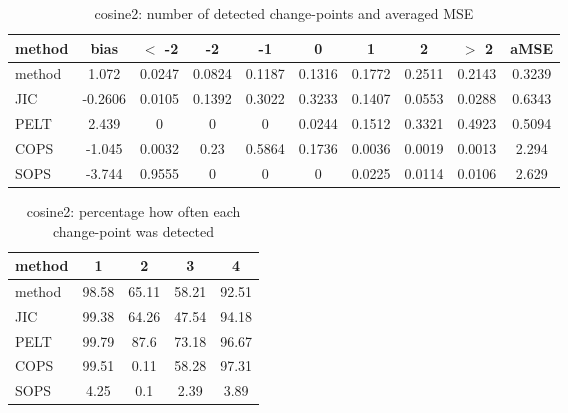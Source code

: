 \begin{table}[ht]
\centering
\begin{tabular}{l|c|ccccccc|c}
  \hline
method & bias & $<$ -2 & -2 & -1 & 0 & 1 & 2 & $>$ 2 & aMSE \\ 
  \hline
method & 1.072 & 0.0247 & 0.0824 & 0.1187 & 0.1316 & 0.1772 & 0.2511 & 0.2143 & 0.3239 \\ 
  JIC & -0.2606 & 0.0105 & 0.1392 & 0.3022 & 0.3233 & 0.1407 & 0.0553 & 0.0288 & 0.6343 \\ 
  PELT & 2.439 &     0 &     0 &     0 & 0.0244 & 0.1512 & 0.3321 & 0.4923 & 0.5094 \\ 
  COPS & -1.045 & 0.0032 &  0.23 & 0.5864 & 0.1736 & 0.0036 & 0.0019 & 0.0013 & 2.294 \\ 
  SOPS & -3.744 & 0.9555 &     0 &     0 &     0 & 0.0225 & 0.0114 & 0.0106 & 2.629 \\ 
   \hline
\end{tabular}
\caption{cosine2: number of detected change-points and averaged MSE} 
\label{tab:cosine2Njumps}
\end{table}
\begin{table}[ht]
\centering
\begin{tabular}{l|cccc}
  \hline
method & 1 & 2 & 3 & 4 \\ 
  \hline
method &  98.58 &  65.11 &  58.21 &  92.51 \\ 
  JIC &  99.38 &  64.26 &  47.54 &  94.18 \\ 
  PELT &  99.79 &   87.6 &  73.18 &  96.67 \\ 
  COPS &  99.51 &   0.11 &  58.28 &  97.31 \\ 
  SOPS &   4.25 &    0.1 &   2.39 &   3.89 \\ 
   \hline
\end{tabular}
\caption{cosine2: percentage how often each change-point was detected} 
\label{tab:cosine2Detections}
\end{table}
